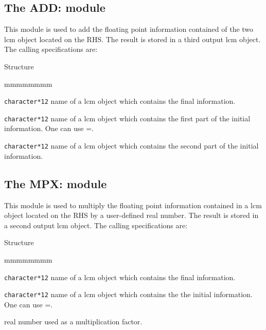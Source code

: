 \clearpage

\subsection{The ADD: module}\label{sect:ADDData}

This module is used to add the floating point information contained of the two
{\sc lcm} object located on the RHS. The
result is stored in a third output {\sc lcm} object. The calling specifications
are:

\begin{DataStructure}{Structure }
 \moc{:=}     \moc{;}
\end{DataStructure}

\begin{ListeDeDescription}{mmmmmmmm}

\item[\dusa{NAME1}] {\tt character*12} name of a {\sc lcm} object which
contains the final information.

\item[\dusa{NAME2}] {\tt character*12} name of a {\sc lcm} object which
contains the first part of the initial information. One can use
=.


\item[\dusa{NAME3}] {\tt character*12} name of a {\sc lcm} object which
contains the second part of the initial information.

\end{ListeDeDescription}

\clearpage

\subsection{The MPX: module}\label{sect:MPXData}

This module is used to multiply the floating point information contained in a
{\sc lcm} object located on the RHS by a user-defined real number. The
result is stored in a second output {\sc lcm} object. The calling specifications
are:

\vskip -0.2cm

\begin{DataStructure}{Structure }
 \moc{:=}    \moc{::}  \moc{;}
\end{DataStructure}

\begin{ListeDeDescription}{mmmmmmmm}

\item[\dusa{NAME1}] {\tt character*12} name of a {\sc lcm} object which
contains the final information.

\item[\dusa{NAME2}] {\tt character*12} name of a {\sc lcm} object which
contains the the initial information. One can use
=.

\item[\dusa{real}] real number used as a multiplication factor.

\end{ListeDeDescription}

